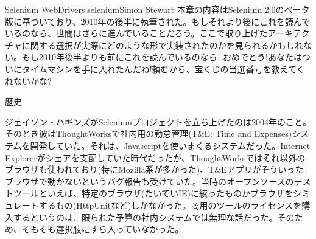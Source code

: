 \begin{aosachapter}{Selenium WebDriver}{s:selenium}{Simon Stewart}
本章の内容はSelenium 2.0のベータ版に基づいており、2010年の後半に執筆された。もしそれより後にこれを読んでいるのなら、世間はさらに進んでいることだろう。ここで取り上げたアーキテクチャに関する選択が実際にどのような形で実装されたのかを見られるかもしれない。もし2010年後半よりも前にこれを読んでいるのなら…おめでとう!あなたはついにタイムマシンを手に入れたんだね!頼むから、宝くじの当選番号を教えてくれないかな?

\begin{aosasect1}{歴史}

ジェイソン・ハギンズがSeleniumプロジェクトを立ち上げたのは2004年のこと。そのとき彼はThoughtWorksで社内用の勤怠管理(T\&E: Time and Expenses)システムを開発していた。それは、Javascriptを使いまくるシステムだった。Internet Explorerがシェアを支配していた時代だったが、ThoughtWorksではそれ以外のブラウザも使われており(特にMozilla系が多かった)、T\&Eアプリがそういったブラウザで動かないというバグ報告も受けていた。当時のオープンソースのテストツールといえば、特定のブラウザ(たいていIE)に絞ったものかブラウザをシミュレートするもの(HttpUnitなど)しかなかった。商用のツールのライセンスを購入するというのは、限られた予算の社内システムでは無理な話だった。そのため、そもそも選択肢にすら入っていなかった。


\end{aosasect1}
\end{aosachapter}
